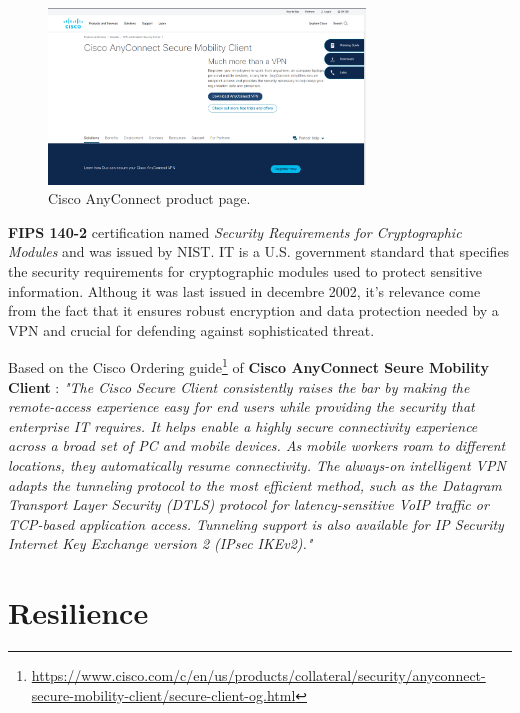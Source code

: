 \documentclass[12pt]{article}
\begin{document}
\begin{figure}[h]
    \centering
    \includegraphics[width=0.75\textwidth]{Figures/Solutions/cisco_vpn.png}
    \caption{Cisco AnyConnect product page.}
\end{figure}

\textbf{FIPS 140-2} certification named \textit{Security Requirements for Cryptographic Modules} and was issued by NIST. IT  is a U.S. government standard that specifies the security requirements for cryptographic modules used to protect sensitive information. 
Althoug it was last issued in decembre 2002, it's relevance come from the fact that it ensures robust encryption and data protection needed by a VPN and crucial for defending against sophisticated threat.

Based on the Cisco Ordering guide\footnote{\url{https://www.cisco.com/c/en/us/products/collateral/security/anyconnect-secure-mobility-client/secure-client-og.html}} of \textbf{Cisco AnyConnect Seure Mobility Client} : \textit{"The Cisco Secure Client consistently raises the bar by making the remote-access experience easy for end users while providing the security that enterprise IT requires. It helps enable a highly secure connectivity experience across a broad set of PC and mobile devices. As mobile workers roam to different locations, they automatically resume connectivity. The always-on intelligent VPN adapts the tunneling protocol to the most efficient method, such as the Datagram Transport Layer Security (DTLS) protocol for latency-sensitive VoIP traffic or TCP-based application access. Tunneling support is also available for IP Security Internet Key Exchange version 2 (IPsec IKEv2)."}

\newpage
\section{Resilience}\label{Sec: Resilience}
\end{document}
